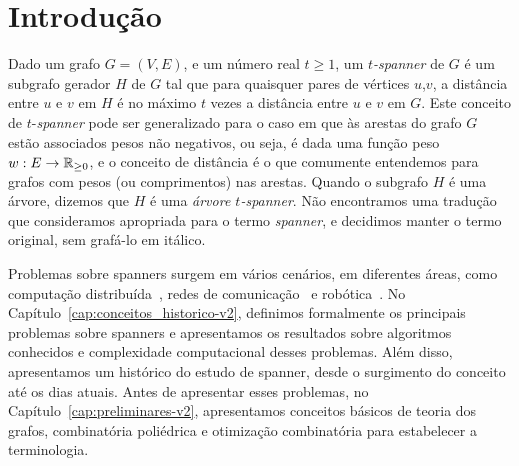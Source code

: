 \chapter{Introdução}
\label{cap:introducao}

Dado um grafo $G = (V,E)$, e um número real $t \ge 1$, um
\emph{$t$-spanner} de $G$ é um subgrafo gerador $H$ de $G$ tal que
para quaisquer pares de vértices $u$,$v$, a distância entre $u$ e $v$
em $H$ é no máximo $t$ vezes a distância entre $u$ e $v$ em $G$.  Este
conceito de $t$-\emph{spanner} pode ser generalizado para o caso em
que às arestas do grafo $G$ estão associados pesos não negativos, ou
seja, é dada uma função peso $w: E \to \mathbb{R}_{\ge 0}$, e o conceito de
distância é o que comumente entendemos para grafos com pesos (ou
comprimentos) nas arestas. Quando o subgrafo $H$ é uma árvore, dizemos
que $H$ é uma \emph{árvore $t$-spanner}. Não encontramos uma tradução
que consideramos apropriada para o termo \emph{spanner}, e decidimos
manter o termo original, sem grafá-lo em itálico. 


Problemas sobre spanners surgem em vários cenários, em diferentes áreas, como computação distribuída~\cite{Awerbuch1985,PelegU1989}, redes de comunicação~\cite{PelegU1988,PelegR1999,OliveiraP2005} e robótica~\cite{ArikatiCCDSZ1996,MarbleB2011,MarbleB2011b}. No Capítulo~\ref{cap:conceitos_historico-v2}, definimos formalmente os principais problemas sobre  spanners e apresentamos os resultados sobre algoritmos conhecidos e complexidade computacional desses problemas. Além disso, apresentamos um histórico do estudo de spanner, desde o surgimento do conceito até os dias atuais. Antes de apresentar esses problemas, no Capítulo~\ref{cap:preliminares-v2}, apresentamos conceitos
  básicos de teoria dos grafos, combinatória poliédrica e otimização
combinatória para estabelecer a terminologia.



